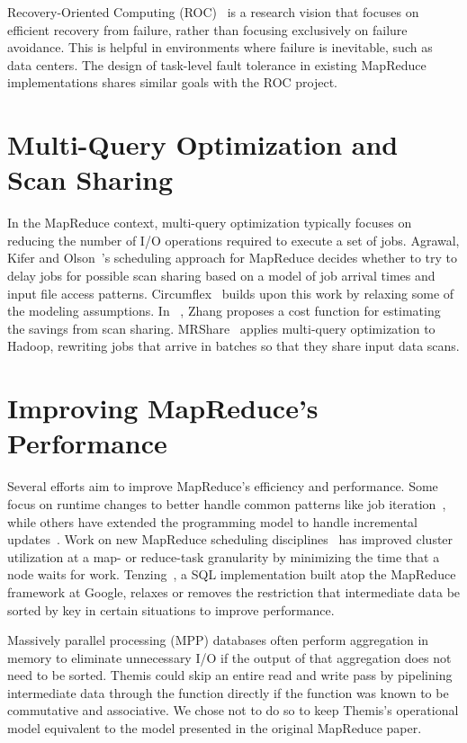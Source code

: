 Recovery-Oriented Computing (ROC)~\cite{microreboot,roc} is a research vision
that focuses on efficient recovery from failure, rather than focusing
exclusively on failure avoidance.  This is helpful in environments where
failure is inevitable, such as data centers.  The design of task-level fault
tolerance in existing MapReduce implementations shares similar goals with the
ROC project.

\section{Multi-Query Optimization and Scan Sharing}

In the MapReduce context, multi-query optimization typically focuses on
reducing the number of I/O operations required to execute a set of jobs.
Agrawal, Kifer and Olson~\cite{ako08}'s scheduling approach for MapReduce
decides whether to try to delay jobs for possible scan sharing based on a model
of job arrival times and input file access patterns.
Circumflex~\cite{circumflex} builds upon this work by relaxing some of the
modeling assumptions.  In ~\cite{upenn-scanshare}, Zhang proposes a cost
function for estimating the savings from scan sharing.  MRShare~\cite{mrshare}
applies multi-query optimization to Hadoop, rewriting jobs that arrive in
batches so that they share input data scans.

\section{Improving MapReduce's Performance}

Several efforts aim to improve MapReduce's efficiency and performance.  Some
focus on runtime changes to better handle common patterns like job
iteration~\cite{haloop}, while others have extended the programming model to
handle incremental updates~\cite{CBP,percolator}.  Work on new MapReduce
scheduling disciplines~\cite{LATE} has improved cluster utilization at a map-
or reduce-task granularity by minimizing the time that a node waits for
work. Tenzing~\cite{tenzing}, a SQL implementation built atop the MapReduce
framework at Google, relaxes or removes the restriction that intermediate data
be sorted by key in certain situations to improve performance.

Massively parallel processing (MPP) databases often perform
aggregation in memory to eliminate unnecessary I/O if the output of that
aggregation does not need to be sorted.  Themis could skip an entire read and
write pass by pipelining intermediate data through the \reduce function
directly if the \reduce function was known to be commutative and
associative. We chose not to do so to keep Themis's operational model
equivalent to the model presented in the original MapReduce paper.

